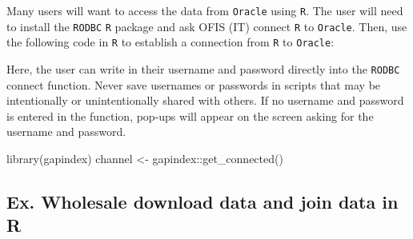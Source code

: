 \documentclass[
  letterpaper,
  oneside,
  open=any]{scrbook}
\newenvironment{Shaded}{\begin{snugshade}}{\end{snugshade}}
\newcommand{\FunctionTok}[1]{\textcolor[rgb]{0.28,0.35,0.67}{#1}}
\newcommand{\NormalTok}[1]{\textcolor[rgb]{0.00,0.23,0.31}{#1}}
\newcommand{\OtherTok}[1]{\textcolor[rgb]{0.00,0.23,0.31}{#1}}
\newcommand{\SpecialCharTok}[1]{\textcolor[rgb]{0.37,0.37,0.37}{#1}}
\begin{document}
Many users will want to access the data from \texttt{Oracle} using
\texttt{R}. The user will need to install the \texttt{RODBC} \texttt{R}
package and ask OFIS (IT) connect \texttt{R} to \texttt{Oracle}. Then,
use the following code in \texttt{R} to establish a connection from
\texttt{R} to \texttt{Oracle}:

Here, the user can write in their username and password directly into
the \texttt{RODBC} connect function. Never save usernames or passwords
in scripts that may be intentionally or unintentionally shared with
others. If no username and password is entered in the function, pop-ups
will appear on the screen asking for the username and password.

\begin{Shaded}
\begin{Highlighting}[]
\FunctionTok{library}\NormalTok{(gapindex)}
\NormalTok{channel }\OtherTok{\textless{}{-}}\NormalTok{ gapindex}\SpecialCharTok{::}\FunctionTok{get\_connected}\NormalTok{()}
\end{Highlighting}
\end{Shaded}

\subsection{Ex. Wholesale download data and join data in
R}\label{ex.-wholesale-download-data-and-join-data-in-r}
\end{document}
